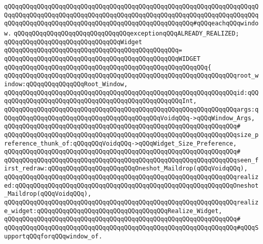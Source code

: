 \verb|qQQqqQQqqQQqqQQqqQQqqQQqqQQqqQQqqQQqqQQqqQQqqQQqqQQqqQQqqQQqqQQqqQQqqQQqqQQqqQQqqQQqqQQqqQQqqQQqqQQqqQQqqQQqqQQqqQQqqQQqqQQqqQQqqQQqqQQqqQQqqQQqqQQqqQQqqQQqqQQqqQQqqQQqqQQqqQQqqQQqqQQqqQQqqQQq#qQQqeachqQQqwindow.|\newline
\newline
\verb|qQQqqQQqqQQqqQQqqQQqqQQqqQQqqQQqexceptionqQQqALREADY_REALIZED;|\newline
\newline
\verb|qQQqqQQqqQQqqQQqqQQqqQQqqQQqqQQqWidget|\newline
\verb|qQQqqQQqqQQqqQQqqQQqqQQqqQQqqQQqqQQqqQQqqQQqqQQq=|\newline
\verb|qQQqqQQqqQQqqQQqqQQqqQQqqQQqqQQqqQQqqQQqqQQqqQQqWIDGET|\newline
\verb|qQQqqQQqqQQqqQQqqQQqqQQqqQQqqQQqqQQqqQQqqQQqqQQqqQQqqQQq{|\newline
\verb|qQQqqQQqqQQqqQQqqQQqqQQqqQQqqQQqqQQqqQQqqQQqqQQqqQQqqQQqqQQqqQQqroot_window:qQQqqQQqqQQqqQQqRoot_Window,|\newline
\verb|qQQqqQQqqQQqqQQqqQQqqQQqqQQqqQQqqQQqqQQqqQQqqQQqqQQqqQQqqQQqqQQqid:qQQqqQQqqQQqqQQqqQQqqQQqqQQqqQQqqQQqqQQqqQQqqQQqqQQqInt,|\newline
\verb|qQQqqQQqqQQqqQQqqQQqqQQqqQQqqQQqqQQqqQQqqQQqqQQqqQQqqQQqqQQqqQQqargs:qQQqqQQqqQQqqQQqqQQqqQQqqQQqqQQqqQQqqQQqqQQqVoidqQQq->qQQqWindow_Args,|\newline
\verb|qQQqqQQqqQQqqQQqqQQqqQQqqQQqqQQqqQQqqQQqqQQqqQQqqQQqqQQqqQQqqQQq#|\newline
\verb|qQQqqQQqqQQqqQQqqQQqqQQqqQQqqQQqqQQqqQQqqQQqqQQqqQQqqQQqqQQqqQQqsize_preference_thunk_of:qQQqqQQqVoidqQQq->qQQqWidget_Size_Preference,|\newline
\verb|qQQqqQQqqQQqqQQqqQQqqQQqqQQqqQQqqQQqqQQqqQQqqQQqqQQqqQQqqQQqqQQq#|\newline
\verb|qQQqqQQqqQQqqQQqqQQqqQQqqQQqqQQqqQQqqQQqqQQqqQQqqQQqqQQqqQQqqQQqseen_first_redraw:qQQqqQQqqQQqqQQqqQQqqQQqOneshot_Maildrop(qQQqVoidqQQq),|\newline
\verb|qQQqqQQqqQQqqQQqqQQqqQQqqQQqqQQqqQQqqQQqqQQqqQQqqQQqqQQqqQQqqQQqrealized:qQQqqQQqqQQqqQQqqQQqqQQqqQQqqQQqqQQqqQQqqQQqqQQqqQQqqQQqqQQqOneshot_Maildrop(qQQqVoidqQQq),|\newline
\verb|qQQqqQQqqQQqqQQqqQQqqQQqqQQqqQQqqQQqqQQqqQQqqQQqqQQqqQQqqQQqqQQqrealize_widget:qQQqqQQqqQQqqQQqqQQqqQQqqQQqqQQqqQQqRealize_Widget,|\newline
\verb|qQQqqQQqqQQqqQQqqQQqqQQqqQQqqQQqqQQqqQQqqQQqqQQqqQQqqQQqqQQqqQQq#|\newline
\verb|qQQqqQQqqQQqqQQqqQQqqQQqqQQqqQQqqQQqqQQqqQQqqQQqqQQqqQQqqQQqqQQq#qQQqSupportqQQqforqQQqwindow_of.|\newline
